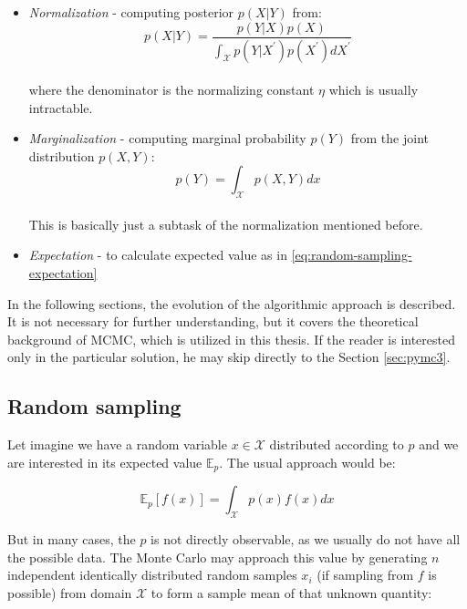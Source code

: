 \documentclass[
  digital, %
  oneside, %
  lof,     %
  lot,     %
]{fithesis4}
\begin{document}
\begin{itemize}
  \item \textit{Normalization} - computing posterior $p(X | Y)$ from:
    \begin{equation}
      p(X | Y) = \frac{p(Y | X) p(X)}{\int_{\mathcal{X}} p(Y | X^\prime) p(X^\prime) dX^\prime}
    \end{equation} \\
    where the denominator is the normalizing constant $\eta$ which is usually intractable.
  \item \textit{Marginalization} - computing marginal probability $p(Y)$ from the joint distribution $p(X, Y)$:
    \begin{equation}
      p(Y) = \int_{\mathcal{X}} p(X, Y) dx
    \end{equation} \\
    This is basically just a subtask of the normalization mentioned before.
  \item \textit{Expectation} - to calculate expected value as in \eqref{eq:random-sampling-expectation}
\end{itemize}

In the following sections, the evolution of the algorithmic approach is described.
It is not necessary for further understanding, but it covers the theoretical background of MCMC, which is utilized in this thesis.
If the reader is interested only in the particular solution, he may skip directly to the Section \ref{sec:pymc3}.


\subsection{Random sampling}

Let imagine we have a random variable $x \in \mathcal{X}$ distributed according to $p$ and we are interested in its expected value $\mathbb{E}_p$.
The usual approach would be:

\begin{equation}\label{eq:random-sampling-expectation}
  \mathbb{E}_{p}\left[ f(x) \right] = \int_{\mathcal{X}} p \left( x \right) f \left( x \right) dx
\end{equation}

But in many cases, the $p$ is not directly observable, as we usually do not have all the possible data.
The Monte Carlo may approach this value by generating $n$ independent identically distributed random samples $x_i$ (if sampling from $f$ is possible) from domain $\mathcal{X}$ to form a sample mean of that unknown quantity:
\end{document}
